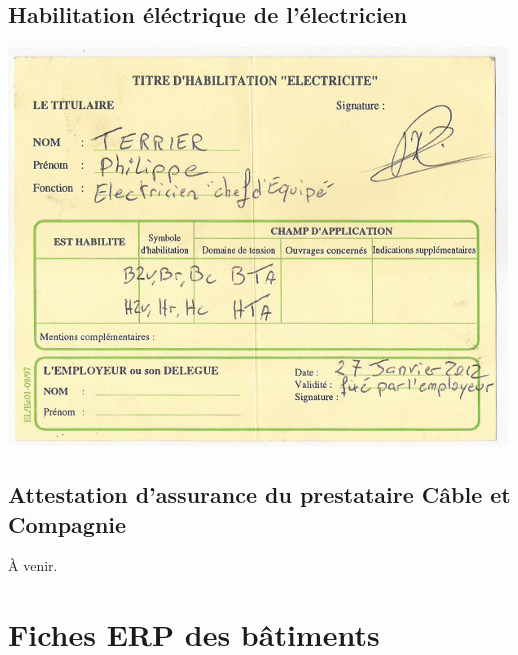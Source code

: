 \documentclass[hidelinks, paper=a4, fontsize=13pt]{report}
\begin{document}
\subsection{Habilitation éléctrique de l'électricien}
\begin{center}
\includegraphics[scale=0.8]{Annexes/Documents/HabilitationPhilty}
\end{center}

\subsection{Attestation d'assurance du prestataire Câble et Compagnie}
À venir.
%
\newpage
\section{Fiches ERP des bâtiments}
\end{document}
